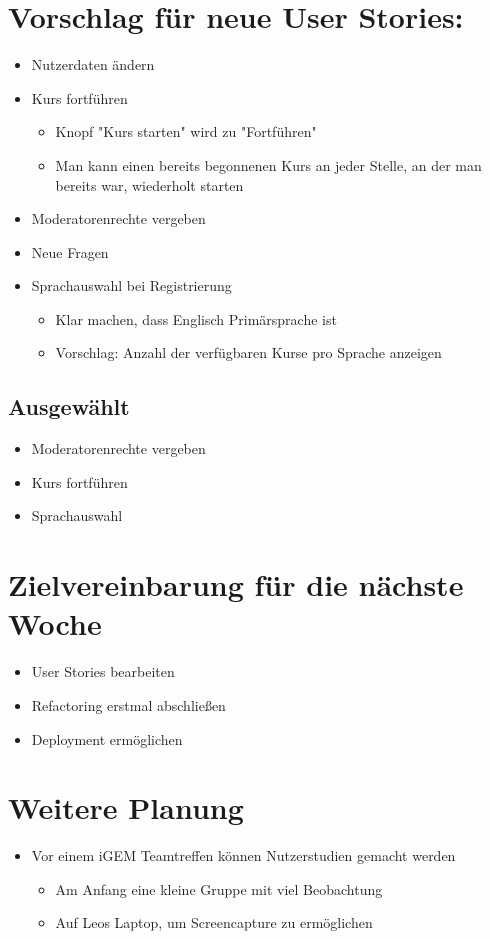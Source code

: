 \documentclass[colorback, accentcolor=tud1c, paper=a4]{tudexercise}
\begin{document}
\begin{multicols}{2}
\section{Vorschlag für neue User Stories:}
\begin{itemize}
\item Nutzerdaten ändern
\item Kurs fortführen
	\begin{itemize}
	\item Knopf "Kurs starten" wird zu "Fortführen"
	\item Man kann einen bereits begonnenen Kurs an jeder Stelle, an der man bereits war, wiederholt starten
	\end{itemize}
\item Moderatorenrechte vergeben
\item Neue Fragen
\item Sprachauswahl bei Registrierung
	\begin{itemize}
	\item Klar machen, dass Englisch Primärsprache ist
	\item Vorschlag: Anzahl der verfügbaren Kurse pro Sprache anzeigen
	\end{itemize}
\end{itemize}

\subsection{Ausgewählt}
\begin{itemize}
\item Moderatorenrechte vergeben
\item Kurs fortführen
\item Sprachauswahl
\end{itemize}

\section{Zielvereinbarung für die nächste Woche}
\begin{itemize}
\item User Stories bearbeiten
\item Refactoring erstmal abschließen
\item Deployment ermöglichen
\end{itemize}

\section{Weitere Planung}
\begin{itemize}
\item Vor einem iGEM Teamtreffen können Nutzerstudien gemacht werden
	\begin{itemize}
	\item Am Anfang eine kleine Gruppe mit viel Beobachtung
	\item Auf Leos Laptop, um Screencapture zu ermöglichen
	\end{itemize}
\end{itemize}
\end{multicols}
\end{document}
